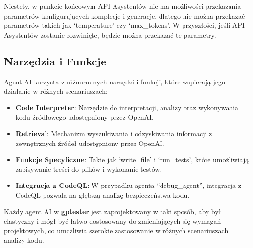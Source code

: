Niestety, w punkcie końcowym API Asystentów nie ma możliwości przekazania parametrów konfigurujących komplecje i generacje, dlatego nie można przekazać parametrów takich jak `temperature' czy `max\_tokens'. W przyszłości, jeśli API Asystentów zostanie rozwinięte, będzie można przekazać te parametry.
\subsection{Narzędzia i Funkcje}

Agent AI korzysta z różnorodnych narzędzi i funkcji, które wspierają jego działanie w różnych scenariuszach:

\begin{itemize}
    \item \textbf{Code Interpreter}: Narzędzie do interpretacji, analizy oraz wykonywania kodu źródłowego udostępniony przez OpenAI.
    \item \textbf{Retrieval}: Mechanizm wyszukiwania i odzyskiwania informacji z zewnętrznych źródeł udostępniony przez OpenAI.
    \item \textbf{Funkcje Specyficzne}: Takie jak `write\_file' i `run\_tests', które umożliwiają zapisywanie treści do plików i wykonanie testów.
    \item \textbf{Integracja z CodeQL}: W przypadku agenta ``debug\_agent'', integracja z CodeQL pozwala na głębszą analizę bezpieczeństwa kodu.
\end{itemize}


Każdy agent AI w \textbf{gptester} jest zaprojektowany w taki sposób, aby był elastyczny i mógł być łatwo dostosowany do zmieniających się wymagań projektowych, co umożliwia szerokie zastosowanie w różnych scenariuszach analizy kodu.


